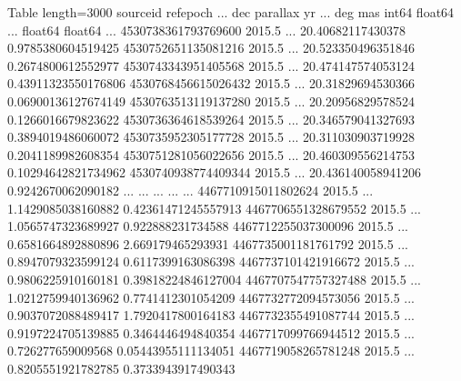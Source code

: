 \documentclass[letterpaper,10pt,english]{sphinxmanual}
\begin{document}
\begin{sphinxVerbatim}[commandchars=\\\{\}]
\PYGZlt{}Table length=3000\PYGZgt{}
     source\PYGZus{}id      ref\PYGZus{}epoch ...        dec               parallax      
                        yr    ...        deg                 mas         
       int64         float64  ...      float64             float64       
\PYGZhy{}\PYGZhy{}\PYGZhy{}\PYGZhy{}\PYGZhy{}\PYGZhy{}\PYGZhy{}\PYGZhy{}\PYGZhy{}\PYGZhy{}\PYGZhy{}\PYGZhy{}\PYGZhy{}\PYGZhy{}\PYGZhy{}\PYGZhy{}\PYGZhy{}\PYGZhy{}\PYGZhy{} \PYGZhy{}\PYGZhy{}\PYGZhy{}\PYGZhy{}\PYGZhy{}\PYGZhy{}\PYGZhy{}\PYGZhy{}\PYGZhy{} ... \PYGZhy{}\PYGZhy{}\PYGZhy{}\PYGZhy{}\PYGZhy{}\PYGZhy{}\PYGZhy{}\PYGZhy{}\PYGZhy{}\PYGZhy{}\PYGZhy{}\PYGZhy{}\PYGZhy{}\PYGZhy{}\PYGZhy{}\PYGZhy{}\PYGZhy{}\PYGZhy{} \PYGZhy{}\PYGZhy{}\PYGZhy{}\PYGZhy{}\PYGZhy{}\PYGZhy{}\PYGZhy{}\PYGZhy{}\PYGZhy{}\PYGZhy{}\PYGZhy{}\PYGZhy{}\PYGZhy{}\PYGZhy{}\PYGZhy{}\PYGZhy{}\PYGZhy{}\PYGZhy{}\PYGZhy{}\PYGZhy{}
4530738361793769600    2015.5 ...  20.40682117430378   0.9785380604519425
4530752651135081216    2015.5 ... 20.523350496351846   0.2674800612552977
4530743343951405568    2015.5 ... 20.474147574053124 \PYGZhy{}0.43911323550176806
4530768456615026432    2015.5 ...  20.31829694530366 \PYGZhy{}0.06900136127674149
4530763513119137280    2015.5 ...  20.20956829578524   0.1266016679823622
4530736364618539264    2015.5 ... 20.346579041327693   0.3894019486060072
4530735952305177728    2015.5 ... 20.311030903719928   0.2041189982608354
4530751281056022656    2015.5 ... 20.460309556214753  0.10294642821734962
4530740938774409344    2015.5 ... 20.436140058941206   0.9242670062090182
                ...       ... ...                ...                  ...
4467710915011802624    2015.5 ... 1.1429085038160882  0.42361471245557913
4467706551328679552    2015.5 ... 1.0565747323689927    0.922888231734588
4467712255037300096    2015.5 ... 0.6581664892880896   \PYGZhy{}2.669179465293931
4467735001181761792    2015.5 ... 0.8947079323599124   0.6117399163086398
4467737101421916672    2015.5 ... 0.9806225910160181 \PYGZhy{}0.39818224846127004
4467707547757327488    2015.5 ... 1.0212759940136962   0.7741412301054209
4467732772094573056    2015.5 ... 0.9037072088489417  \PYGZhy{}1.7920417800164183
4467732355491087744    2015.5 ... 0.9197224705139885  \PYGZhy{}0.3464446494840354
4467717099766944512    2015.5 ...  0.726277659009568  0.05443955111134051
4467719058265781248    2015.5 ... 0.8205551921782785   0.3733943917490343
\end{sphinxVerbatim}
\end{document}
